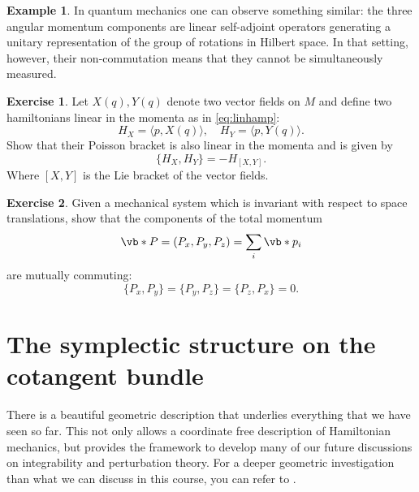 \documentclass[english,fontsize=11pt,paper=b5]{scrbook}
\theoremstyle{definition}
\newtheorem{example}{Example}[chapter]
\newtheorem{exercise}{Exercise}[chapter]
\begin{document}
\begin{example}
      In quantum mechanics one can observe something similar: the three angular momentum components are linear self-adjoint operators generating a unitary representation of the group of rotations in Hilbert space.
      In that setting, however, their non-commutation means that they cannot be simultaneously measured.
    \end{example}

    \begin{exercise}
      Let $X(q), Y(q)$ denote two vector fields on $M$ and define two hamiltonians linear in the momenta as in \eqref{eq:linhamp}:
      \begin{equation}
        H_X = \langle p, X(q)\rangle,\quad H_Y = \langle p, Y(q) \rangle.
      \end{equation}
      Show that their Poisson bracket is also linear in the momenta and is given by
      \begin{equation}
        \big\{H_X, H_Y\big\} = - H_{[X,Y]}.
      \end{equation}
      Where $[X,Y]$ is the Lie bracket of the vector fields.
    \end{exercise}

    \begin{exercise}
      Given a mechanical system which is invariant with respect to space translations, show that the components of the total momentum
      \begin{equation}
        \vb* P = (P_x, P_y, P_z) = \sum_i \vb*{p}_i
      \end{equation}
      are mutually commuting:
      \begin{equation}
        \big\{P_x, P_y\big\}
        =\big\{P_y, P_z\big\}
        =\big\{P_z, P_x\big\}
        =0.
      \end{equation}
    \end{exercise}

    \section{The symplectic structure on the cotangent bundle}

    There is a beautiful geometric description that underlies everything that we have seen so far.
    This not only allows a coordinate free description of Hamiltonian mechanics, but provides the framework to develop many of our future discussions on integrability and perturbation theory.
    For a deeper geometric investigation than what we can discuss in this course, you can refer to \cite{book:dasilva}.
\end{document}
